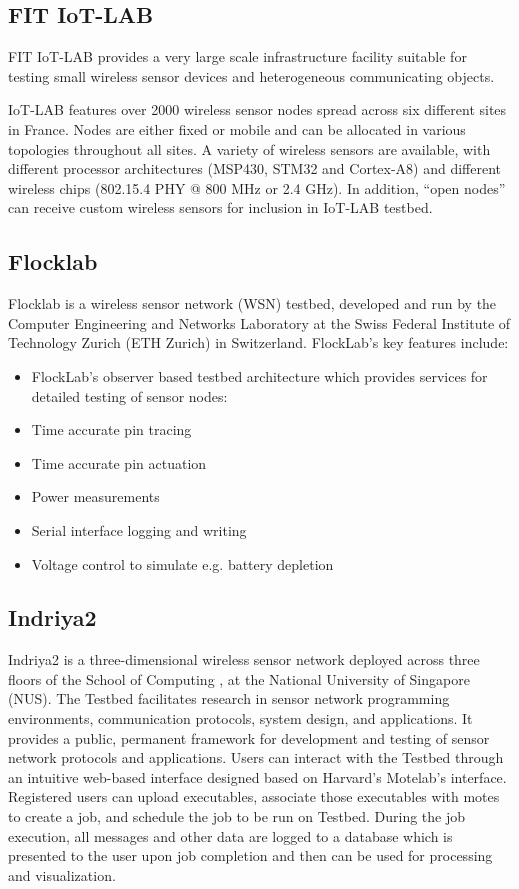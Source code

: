 \subsection{FIT IoT-LAB}
FIT IoT-LAB \cite{FIT-IoT} provides a very large scale infrastructure facility suitable for testing small wireless sensor devices and heterogeneous communicating objects.

IoT-LAB features over 2000 wireless sensor nodes spread across six different sites in France.  Nodes are either fixed or mobile and can be allocated in various topologies throughout all sites.  A variety of wireless sensors are available, with different processor architectures (MSP430, STM32 and Cortex-A8) and different wireless chips (802.15.4 PHY @ 800 MHz or 2.4 GHz).  In addition, “open nodes” can receive custom wireless sensors for inclusion in IoT-LAB testbed.

\subsection{Flocklab}

Flocklab \cite{flocklab} is a wireless sensor network (WSN) testbed, developed and run by the ​Computer Engineering and Networks Laboratory at the ​Swiss Federal Institute of Technology Zurich (ETH Zurich) in Switzerland. FlockLab's key features include:
\begin{itemize}
	\item FlockLab's observer based testbed architecture which provides services for detailed testing of sensor nodes:
	\item Time accurate pin tracing
	\item Time accurate pin actuation
	\item Power measurements
	\item Serial interface logging and writing
	\item Voltage control to simulate e.g. battery depletion
\end{itemize}

\subsection{Indriya2}

Indriya2 \cite{indriya2} is a three-dimensional wireless sensor network deployed across three floors of the School of Computing , at the National University of Singapore (NUS). The Testbed facilitates research in sensor network programming environments, communication protocols, system design, and applications. It provides a public, permanent framework for development and testing of sensor network protocols and applications. Users can interact with the Testbed through an intuitive web-based interface designed based on Harvard's Motelab's interface. Registered users can upload executables, associate those executables with motes to create a job, and schedule the job to be run on Testbed. During the job execution, all messages and other data are logged to a database which is presented to the user upon job completion and then can be used for processing and visualization. 

